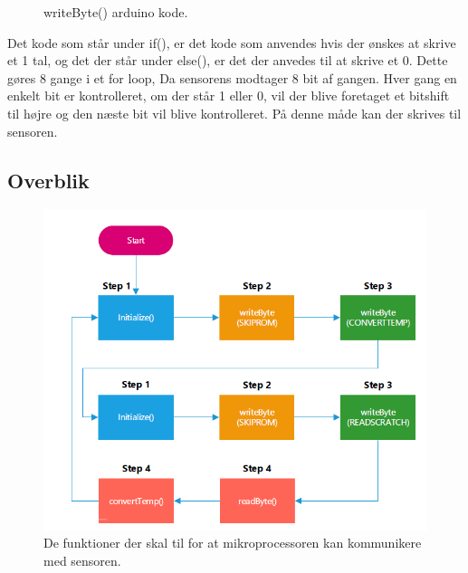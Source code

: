 \begin{figure}[h!]
  \centering
  \caption{writeByte() arduino kode.}
  \label{write_byte}
\end{figure}
Det kode som står under if(), er det kode som anvendes hvis der ønskes at skrive et 1 tal, og det der står under else(), er det der anvedes til at skrive et 0. Dette gøres 8 gange i et for loop, Da sensorens modtager 8 bit af gangen. Hver gang en enkelt bit er kontrolleret, om der står 1 eller 0, vil der blive foretaget et bitshift til højre og den næste bit vil blive kontrolleret. På denne måde kan der skrives til sensoren.


\subsection{Overblik}

\begin{figure}[h!]
  \centering
  \includegraphics[width=1\textwidth]{figures/sensor_communication.png}
  \caption{De funktioner der skal til for at mikroprocessoren kan kommunikere med sensoren.}
  \label{sensor_total}
\end{figure}
